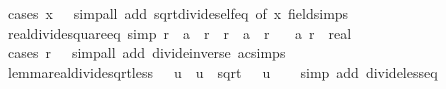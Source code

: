 \begin{isabellebody}
%
\isatagproof
{}\isamarkupfalse%
\ {\isacharparenleft}{\kern0pt}cases\ {\isachardoublequoteopen}x\ {\isacharequal}{\kern0pt}\ {}{\isachardoublequoteclose}{\isacharparenright}{\kern0pt}\ {\isacharparenleft}{\kern0pt}simp{\isacharunderscore}{\kern0pt}all\ add{\isacharcolon}{\kern0pt}\ sqrt{\isacharunderscore}{\kern0pt}divide{\isacharunderscore}{\kern0pt}self{\isacharunderscore}{\kern0pt}eq\ {\isacharbrackleft}{\kern0pt}of\ x{\isacharbrackright}{\kern0pt}\ field{\isacharunderscore}{\kern0pt}simps{\isacharparenright}{\kern0pt}%
\endisatagproof
{\isafoldproof}%
%
\isadelimproof
\isanewline
%
\endisadelimproof
\isanewline
{}\isamarkupfalse%
\ real{\isacharunderscore}{\kern0pt}divide{\isacharunderscore}{\kern0pt}square{\isacharunderscore}{\kern0pt}eq\ {\isacharbrackleft}{\kern0pt}simp{\isacharbrackright}{\kern0pt}{\isacharcolon}{\kern0pt}\ {\isachardoublequoteopen}{\isacharparenleft}{\kern0pt}r\ {\isacharasterisk}{\kern0pt}\ a{\isacharparenright}{\kern0pt}\ {\isacharslash}{\kern0pt}\ {\isacharparenleft}{\kern0pt}r\ {\isacharasterisk}{\kern0pt}\ r{\isacharparenright}{\kern0pt}\ {\isacharequal}{\kern0pt}\ a\ {\isacharslash}{\kern0pt}\ r{\isachardoublequoteclose}\isanewline
\ \ \ a\ r\ {\isacharcolon}{\kern0pt}{\isacharcolon}{\kern0pt}\ real\isanewline
%
\isadelimproof
\ \ %
\endisadelimproof
%
\isatagproof
{}\isamarkupfalse%
\ {\isacharparenleft}{\kern0pt}cases\ {\isachardoublequoteopen}r\ {\isacharequal}{\kern0pt}\ {}{\isachardoublequoteclose}{\isacharparenright}{\kern0pt}\ {\isacharparenleft}{\kern0pt}simp{\isacharunderscore}{\kern0pt}all\ add{\isacharcolon}{\kern0pt}\ divide{\isacharunderscore}{\kern0pt}inverse\ ac{\isacharunderscore}{\kern0pt}simps{\isacharparenright}{\kern0pt}%
\endisatagproof
{\isafoldproof}%
%
\isadelimproof
\isanewline
%
\endisadelimproof
\isanewline
{}\isamarkupfalse%
\ lemma{\isacharunderscore}{\kern0pt}real{\isacharunderscore}{\kern0pt}divide{\isacharunderscore}{\kern0pt}sqrt{\isacharunderscore}{\kern0pt}less{\isacharcolon}{\kern0pt}\ {\isachardoublequoteopen}{}\ {\isacharless}{\kern0pt}\ u\ {\isasymLongrightarrow}\ u\ {\isacharslash}{\kern0pt}\ sqrt\ {}\ {\isacharless}{\kern0pt}\ u{\isachardoublequoteclose}\isanewline
%
\isadelimproof
\ \ %
\endisadelimproof
%
\isatagproof
{}\isamarkupfalse%
\ {\isacharparenleft}{\kern0pt}simp\ add{\isacharcolon}{\kern0pt}\ divide{\isacharunderscore}{\kern0pt}less{\isacharunderscore}{\kern0pt}eq{\isacharparenright}{\kern0pt}%
\endisatagproof
{\isafoldproof}%
%
\isadelimproof

\end{isabellebody}
